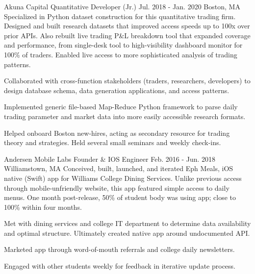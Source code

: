

\begin{cventries}
  \cventry
    {Akuna Capital}
    {Quantitative Developer (Jr.)}
    {Jul. 2018 - Jan. 2020} %
    {Boston, MA} %
    {Specialized in Python dataset construction for this quantitative trading
    firm. Designed and built research datasets that improved access speeds up to
    100x over prior APIs. Also rebuilt live trading P\&L breakdown tool that
    expanded coverage and performance, from single-desk tool to high-visibility
    dashboard monitor for 100\% of traders. Enabled live access to more
    sophisticated analysis of trading patterns.}
    {\begin{cvitems} %
      \item Collaborated with cross-function stakeholders (traders,
            researchers, developers) to design database schema, data
            generation applications, and access patterns.
      \item Implemented generic file-based Map-Reduce Python framework to
            parse daily trading parameter and market data into more easily
            accessible research formats.
      \item Helped onboard Boston new-hires, acting as secondary resource
            for trading theory and strategies. Held several small seminars and
            weekly check-ins.
    \end{cvitems}}

\cventry
{Andersen Mobile Labs} %
{Founder \& IOS Engineer} %
{Feb. 2016 - Jun. 2018} %
{Williamstown, MA} %
{Conceived, built, launched, and iterated Eph Meals, iOS native (Swift) app for
Williams College Dining Services. Unlike previous access through
mobile-unfriendly website, this app featured simple access to daily menus. One
month post-release, 50\% of student body was using app; close to 100\% within
four months.}
{\begin{cvitems} %
\item Met with dining services and college IT department to determine data
availability and optimal structure. Ultimately created native app around
undocumented API.
\item Marketed app through word-of-mouth referrals and college daily
newsletters.
\item Engaged with other students weekly for feedback in iterative update
process.
\end{cvitems}}


\end{cventries}
